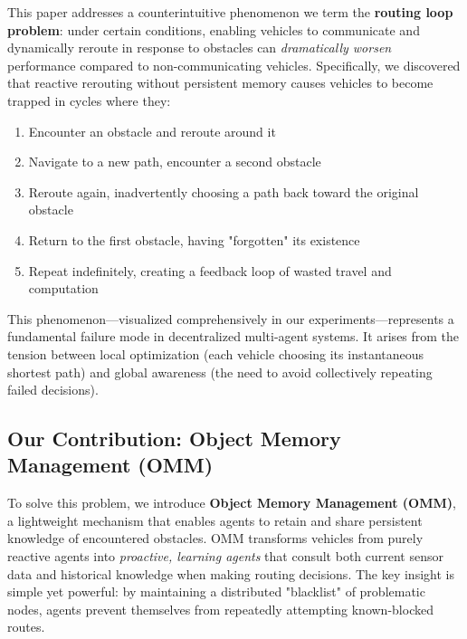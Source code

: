 \documentclass[conference]{IEEEtran}
\begin{document}
This paper addresses a counterintuitive phenomenon we term the \textbf{routing loop problem}: under certain conditions, enabling vehicles to communicate and dynamically reroute in response to obstacles can \textit{dramatically worsen} performance compared to non-communicating vehicles. Specifically, we discovered that reactive rerouting without persistent memory causes vehicles to become trapped in cycles where they:
\begin{enumerate}
    \item Encounter an obstacle and reroute around it
    \item Navigate to a new path, encounter a second obstacle
    \item Reroute again, inadvertently choosing a path back toward the original obstacle
    \item Return to the first obstacle, having "forgotten" its existence
    \item Repeat indefinitely, creating a feedback loop of wasted travel and computation
\end{enumerate}

This phenomenon—visualized comprehensively in our experiments—represents a fundamental failure mode in decentralized multi-agent systems. It arises from the tension between local optimization (each vehicle choosing its instantaneous shortest path) and global awareness (the need to avoid collectively repeating failed decisions).

\subsection{Our Contribution: Object Memory Management (OMM)}

To solve this problem, we introduce \textbf{Object Memory Management (OMM)}, a lightweight mechanism that enables agents to retain and share persistent knowledge of encountered obstacles. OMM transforms vehicles from purely reactive agents into \textit{proactive, learning agents} that consult both current sensor data and historical knowledge when making routing decisions. The key insight is simple yet powerful: by maintaining a distributed "blacklist" of problematic nodes, agents prevent themselves from repeatedly attempting known-blocked routes.
\end{document}
